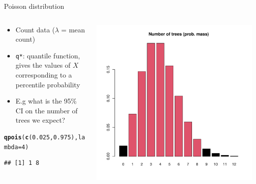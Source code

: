 \documentclass[aspectratio=169]{beamer}\usepackage[]{graphicx}\usepackage[]{color}
\makeatletter
\def\maxwidth{ %
  \ifdim\Gin@nat@width>\linewidth
    \linewidth
  \else
    \Gin@nat@width
  \fi
}
\newcommand{\hlnum}[1]{\textcolor[rgb]{0.686,0.059,0.569}{#1}}%
\newcommand{\hlstd}[1]{\textcolor[rgb]{0.345,0.345,0.345}{#1}}%
\newcommand{\hlkwc}[1]{\textcolor[rgb]{0.333,0.667,0.333}{#1}}%
\newcommand{\hlkwd}[1]{\textcolor[rgb]{0.737,0.353,0.396}{\textbf{#1}}}%
\newenvironment{kframe}{%
 \def\at@end@of@kframe{}%
 \ifinner\ifhmode%
  \def\at@end@of@kframe{\end{minipage}}%
  \begin{minipage}{\columnwidth}%
 \fi\fi%
 \def\FrameCommand##1{\hskip\@totalleftmargin \hskip-\fboxsep
 \colorbox{shadecolor}{##1}\hskip-\fboxsep
     \hskip-\linewidth \hskip-\@totalleftmargin \hskip\columnwidth}%
 \MakeFramed {\advance\hsize-\width
   \@totalleftmargin\z@ \linewidth\hsize
   \@setminipage}}%
 {\par\unskip\endMakeFramed%
 \at@end@of@kframe}
\newenvironment{knitrout}{}{} %
\makeatother
\begin{document}
\begin{frame}[fragile]{Poisson distribution}
\begin{columns}
  \begin{column}{0.5\textwidth}
  \begin{itemize}
    \item Count data ($\lambda$ = mean count)
    \item \texttt{q*}: quantile function, gives the values of $X$ corresponding to a percentile probability
    \item E.g what is the 95\% CI on the number of trees we expect?
  \end{itemize}
\begin{knitrout}\scriptsize
{}\color{fgcolor}\begin{kframe}
\begin{alltt}
\hlkwd{qpois}\hlstd{(}\hlkwd{c}\hlstd{(}\hlnum{0.025}\hlstd{,}\hlnum{0.975}\hlstd{),}\hlkwc{lambda}\hlstd{=}\hlnum{4}\hlstd{)}
\end{alltt}
\begin{verbatim}
## [1] 1 8
\end{verbatim}
\end{kframe}
\end{knitrout}
  \end{column}
  \begin{column}{0.5\textwidth}
\begin{knitrout}\scriptsize
{}\color{fgcolor}
\includegraphics[width=\maxwidth]{figure/unnamed-chunk-8-1} 

\end{knitrout}
  \end{column}
\end{columns}
\end{frame}
\end{document}
